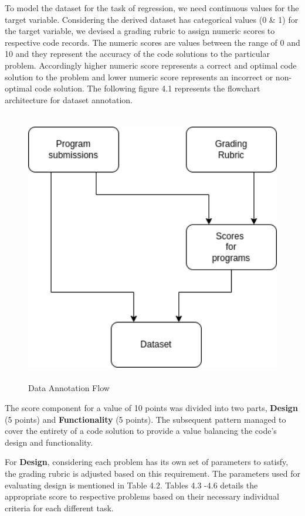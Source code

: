 To model the dataset for the task of regression, we need continuous values for the target variable. Considering the derived dataset has categorical values (0 \& 1) for the target variable, we devised a grading rubric to assign numeric scores to respective code records. The numeric scores are values between the range of 0 and 10 and they represent the accuracy of the code solutions to the particular problem. Accordingly higher numeric score represents a correct and optimal code solution to the problem and lower numeric score represents an incorrect or non-optimal code solution. The following figure 4.1 represents the flowchart architecture for dataset annotation. 

\begin{figure}[h]
\centering
\includegraphics[height=12cm]{./figures/data.png}
\caption{Data Annotation Flow}
\label{fig1}
\end{figure}

The score component for a value of 10 points was divided into two parts, \textbf{Design} (5 points) and \textbf{Functionality} (5 points). The subsequent pattern managed to cover the entirety of a code solution to provide a value balancing the code's design and functionality. 


For \textbf{Design}, considering each problem has its own set of parameters to satisfy, the grading rubric is adjusted based on this requirement. The parameters used for evaluating design is mentioned in Table 4.2. Tables 4.3 -4.6 details the appropriate score to respective problems based on their necessary individual criteria for each different task.
        
